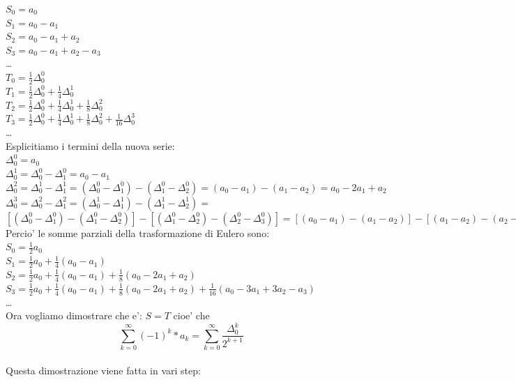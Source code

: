 \documentclass[12pt,a4paper]{article}
\begin{document}
\begin{flushleft}
\vspace{5mm}
$S_0 = a_0$\\
$S_1 = a_0 - a_1$\\
$S_2 = a_0 - a_1 + a_2$\\
$S_3 = a_0 - a_1 + a_2 - a_3$\\
\dots\\
$T_0 = \frac{1}{2}\Delta_0^0$\\
$T_1 = \frac{1}{2}\Delta_0^0 + \frac{1}{4}\Delta_0^1$\\
$T_2 = \frac{1}{2}\Delta_0^0 + \frac{1}{4}\Delta_0^1 +  \frac{1}{8}\Delta_0^2$\\
$T_3 = \frac{1}{2}\Delta_0^0 + \frac{1}{4}\Delta_0^1 +  \frac{1}{8}\Delta_0^2 + \frac{1}{16}\Delta_0^3$\\
\dots\\
\vspace{5mm}
Esplicitiamo i termini della nuova serie:\\
$\Delta_0^0 = a_0$\\
$\Delta_0^1 = \Delta_0^0 - \Delta_1^0 = a_0 - a_1$\\
$\Delta_0^2 = \Delta_0^1 - \Delta_1^1 = (\Delta_0^0 - \Delta_1^0) - (\Delta_1^0 - \Delta_2^0) = (a_0 - a_1) - (a_1 - a_2) = a_0 - 2a_1 + a_2$\\
$\Delta_0^3 = \Delta_0^2 - \Delta_1^2 = (\Delta_0^1 -\Delta_1^1) - (\Delta _1^1 - \Delta _2^1) =$\\$[(\Delta _0^0 -\Delta_1^0) -(\Delta_1^0 - \Delta_2^0)] - [(\Delta_1^0 - \Delta_2^0) - (\Delta_2^0 -\Delta_3^0)] = [(a_0 - a_1) - (a_1 - a_2)] - [(a_1 - a_2) - (a_2 - a_3)] = a_0-3a_1+3a_2-a_3$\\
\vspace{5mm}
Percio' le somme parziali della trasformazione di Eulero sono:\\
$S_0 = \frac{1}{2}a_0$\\
$S_1 = \frac{1}{2}a_0 + \frac{1}{4}(a_0 - a_1)$\\
$S_2 = \frac{1}{2}a_0 + \frac{1}{4}(a_0 - a_1) + \frac{1}{8}(a_0 - 2a_1 + a_2)$\\
$S_3 = \frac{1}{2}a_0 + \frac{1}{4}(a_0 - a_1) + 
\frac{1}{8}(a_0 - 2a_1 + a_2) + \frac{1}{16}(a_0 - 3a_1 + 3a_2 - a_3)$\\
\dots\\
\vspace{5mm}
Ora vogliamo dimostrare che e': $S=T$ cioe' che\\
\begin{equation}
\label{eq:ind5}
\sum_{k=0}^{\infty}(-1)^k*a_k = \sum_{k=0}^{\infty}\frac{\Delta_0^k}{2^{k+1}}
\end{equation}
\\
\vspace{10mm}
Questa dimostrazione viene fatta in vari step:


\end{flushleft}
\end{document}
